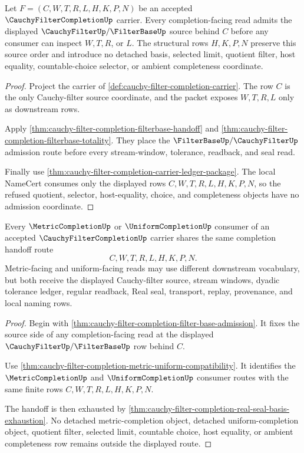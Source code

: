 \begin{theorem}
\label{thm:cauchy-filter-completion-filter-base-admission}
Let $F=(C,W,T,R,L,H,K,P,N)$ be an accepted $\CauchyFilterCompletionUp$ carrier. Every completion-facing read admits the displayed $\CauchyFilterUp/\FilterBaseUp$ source behind $C$ before any consumer can inspect $W,T,R$, or $L$. The structural rows $H,K,P,N$ preserve this source order and introduce no detached basis, selected limit, quotient filter, host equality, countable-choice selector, or ambient completeness coordinate.
\end{theorem}
\begin{proof}
Project the carrier of \autoref{def:cauchy-filter-completion-carrier}. The row $C$ is the only Cauchy-filter source coordinate, and the packet exposes $W,T,R,L$ only as downstream rows.

Apply \autoref{thm:cauchy-filter-completion-filterbase-handoff} and \autoref{thm:cauchy-filter-completion-filterbase-totality}. They place the $\FilterBaseUp/\CauchyFilterUp$ admission route before every stream-window, tolerance, readback, and seal read.

Finally use \autoref{thm:cauchy-filter-completion-carrier-ledger-package}. The local NameCert consumes only the displayed rows $C,W,T,R,L,H,K,P,N$, so the refused quotient, selector, host-equality, choice, and completeness objects have no admission coordinate.
\end{proof}

\begin{theorem}
\label{thm:cauchy-filter-completion-completion-handoff}
Every $\MetricCompletionUp$ or $\UniformCompletionUp$ consumer of an accepted $\CauchyFilterCompletionUp$ carrier shares the same completion handoff route
$$
C,W,T,R,L,H,K,P,N .
$$
Metric-facing and uniform-facing reads may use different downstream vocabulary, but both receive the displayed Cauchy-filter source, stream windows, dyadic tolerance ledger, regular readback, Real seal, transport, replay, provenance, and local naming rows.
\end{theorem}
\begin{proof}
Begin with \autoref{thm:cauchy-filter-completion-filter-base-admission}. It fixes the source side of any completion-facing read at the displayed $\CauchyFilterUp/\FilterBaseUp$ row behind $C$.

Use \autoref{thm:cauchy-filter-completion-metric-uniform-compatibility}. It identifies the $\MetricCompletionUp$ and $\UniformCompletionUp$ consumer routes with the same finite rows $C,W,T,R,L,H,K,P,N$.

The handoff is then exhausted by \autoref{thm:cauchy-filter-completion-real-seal-basis-exhaustion}. No detached metric-completion object, detached uniform-completion object, quotient filter, selected limit, countable choice, host equality, or ambient completeness row remains outside the displayed route.
\end{proof}

